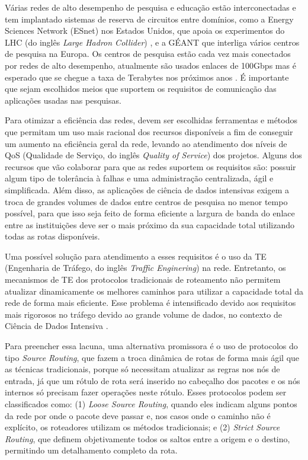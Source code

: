 \documentclass[12pt]{article}
\begin{document}
Várias redes de alto desempenho de pesquisa e educação estão interconectadas e tem implantado sistemas de reserva de circuitos entre domínios, como a Energy Sciences Network (ESnet) nos Estados Unidos, que apoia os experimentos do LHC (do inglês \textit{Large Hadron Collider}) \cite{8665783}, e a GÉANT \cite{valera2019geant} que interliga vários centros de pesquisa na Europa.
%
Os centros de pesquisa estão cada vez mais conectados por redes de alto desempenho, atualmente são usados enlaces de 100Gbps mas é esperado que se chegue a taxa de Terabytes nos próximos anos  \cite{zurawski2021}. É importante que sejam escolhidos meios que suportem os requisitos de comunicação das aplicações usadas nas pesquisas. 

Para otimizar a eficiência das redes, devem ser escolhidas ferramentas e métodos que permitam um uso mais racional dos recursos disponíveis a fim de conseguir um aumento na eficiência geral da rede, levando ao atendimento dos níveis de QoS (Qualidade de Serviço, do inglês \textit{Quality of Service}) dos projetos. Alguns dos recursos que vão colaborar para que as redes suportem os requisitos são: possuir algum tipo de tolerância à falhas e uma administração centralizada, ágil e simplificada.
Além disso, as aplicações de ciência de dados intensivas exigem a troca de grandes volumes de dados entre centros de pesquisa no menor tempo possível, para que isso seja feito de forma eficiente a largura de banda do enlace entre as instituições deve ser o mais próximo da sua capacidade total utilizando todas as rotas disponíveis.


Uma possível solução para atendimento a esses requisitos é o uso da TE (Engenharia de Tráfego, do inglês \textit{Traffic Enginering}) na rede. Entretanto, os mecanismos de TE dos protocolos tradicionais de roteamento não permitem atualizar dinamicamente os melhores caminhos para utilizar a capacidade total da rede de forma mais eficiente. Esse problema é intensificado devido aos requisitos mais rigorosos no tráfego devido ao grande volume de dados, no contexto de Ciência de Dados Intensiva \cite{babik2020network}.

Para preencher essa lacuna, uma alternativa promissora é o uso de protocolos do tipo \textit{Source Routing}, que fazem a troca dinâmica de rotas de forma mais ágil que as técnicas tradicionais, porque só necessitam atualizar as regras nos nós de entrada, já que um rótulo de rota será inserido no cabeçalho dos pacotes e os nós internos só precisam fazer operações neste rótulo. Esses protocolos podem ser classificados como: (1) \textit{Loose Source Routing}, quando eles indicam alguns pontos da rede por onde o pacote deve passar e, nos casos onde o caminho não é explícito, os roteadores utilizam os métodos tradicionais; e (2) \textit{Strict Source Routing}, que definem objetivamente todos os saltos entre a origem e o destino, permitindo um detalhamento completo da rota. 
\end{document}
